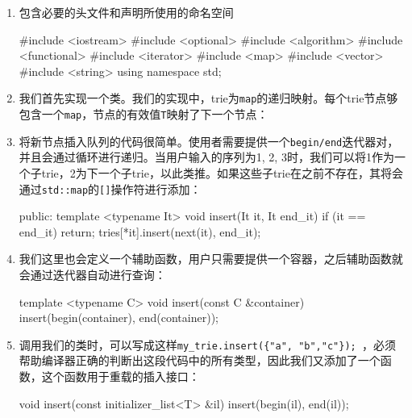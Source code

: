 \begin{enumerate}
\item 包含必要的头文件和声明所使用的命名空间

\begin{codebox}[cpp]
#include <iostream>
#include <optional>
#include <algorithm>
#include <functional>
#include <iterator>
#include <map>
#include <vector>
#include <string>
using namespace std;
\end{codebox}

\item 我们首先实现一个类。我们的实现中，trie为\texttt{map}的递归映射。每个trie节点够包含一个\texttt{map}，节点的有效值\texttt{T}映射了下一个节点：

\begin{codebox}[cpp]
template <typename T>
class trie
{
    map<T, trie> tries;
\end{codebox}

\item 将新节点插入队列的代码很简单。使用者需要提供一个\texttt{begin/end}迭代器对，并且会通过循环进行递归。当用户输入的序列为{1, 2, 3}时，我们可以将1作为一个子trie，2为下一个子trie，以此类推。如果这些子trie在之前不存在，其将会通过\texttt{std::map}的\texttt{[]}操作符进行添加：

\begin{codebox}[cpp]
public:
    template <typename It>
    void insert(It it, It end_it) {
        if (it == end_it) { return; }
        tries[*it].insert(next(it), end_it);
    }
\end{codebox}

\item 我们这里也会定义一个辅助函数，用户只需要提供一个容器，之后辅助函数就会通过迭代器自动进行查询：

\begin{codebox}[cpp]
    template <typename C>
    void insert(const C &container) {
        insert(begin(container), end(container));
    } 
\end{codebox}

\item 调用我们的类时，可以写成这样\texttt{my\_trie.insert(\{"a", "b","c"\}); }，必须帮助编译器正确的判断出这段代码中的所有类型，因此我们又添加了一个函数，这个函数用于重载的插入接口：

\begin{codebox}[cpp]
    void insert(const initializer_list<T> &il) {
        insert(begin(il), end(il));
    }
\end{codebox}


\end{enumerate}
